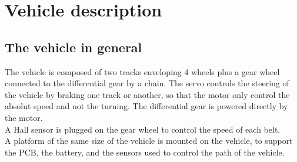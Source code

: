\section{Vehicle description}

\subsection{The vehicle in general}

The vehicle is composed of two tracks enveloping 4 wheels plus a gear wheel connected to the differential gear by a chain. The servo controls the steering of the vehicle by braking one track or another, so that the motor only control the absolut speed and not the turning. The differential gear is powered directly by the motor.\\
A Hall sensor is plugged on the gear wheel to control the speed of each belt.\\
A platform of the same size of the vehicle is mounted on the vehicle, to support the PCB, the battery, and the sensors used to control the path of the vehicle.\\